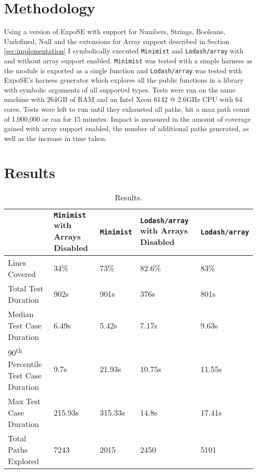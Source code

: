 \documentclass[]{final_report}
\begin{document}
\section{Methodology}
Using a version of ExpoSE with support for Numbers, Strings, Booleans, Undefined, Null and the extensions for Array support described in Section \ref{sec:implementation} I symbolically executed \lstinline|Minimist| and \lstinline|Lodash/array| with and without array support enabled. \lstinline|Minimist| was tested with a simple harness as the module is exported as a single function and \lstinline|Lodash/array| was tested with ExpoSE's harness generator which explores all the public functions in a library with symbolic arguments of all supported types. Tests were run on the same machine with 264GB of RAM and an Intel Xeon 6142 @ 2.6GHz CPU with 64 cores. Tests were left to run until they exhausted all paths, hit a max path count of 1,000,000 or ran for 15 minutes. Impact is measured in the amount of coverage gained with array support enabled, the number of additional paths generated, as well as the increase in time taken.

\section{Results}
\begin{table}[t]
\centering
\begin{tabular}{|p{4cm}|p{2cm}|p{2cm}|p{2cm}|p{2cm}|}
\hline
& \lstinline|Minimist| with Arrays Disabled & \lstinline|Minimist| & \lstinline|Lodash/array| with Arrays Disabled & \lstinline|Lodash/array| \\ \hline
Lines Covered & 34\% & 73\% & 82.6\% & 83\% \\ \hline
Total Test Duration & 902s & 901s & 376s & 801s \\ \hline
Median Test Case Duration & 6.49s & 5.42s & 7.17s & 9.63s \\ \hline
90\textsuperscript{th} Percentile Test Case Duration & 9.7s & 21.93s & 10.75s & 11.55s \\ \hline
Max Test Case Duration & 215.93s & 315.33s & 14.8s & 17.41s \\ \hline
Total Paths Explored & 7243 & 2015 & 2450 & 5101 \\ \hline
\end{tabular}
\caption{Results.}
\label{table:results}
\end{table}
\end{document}
